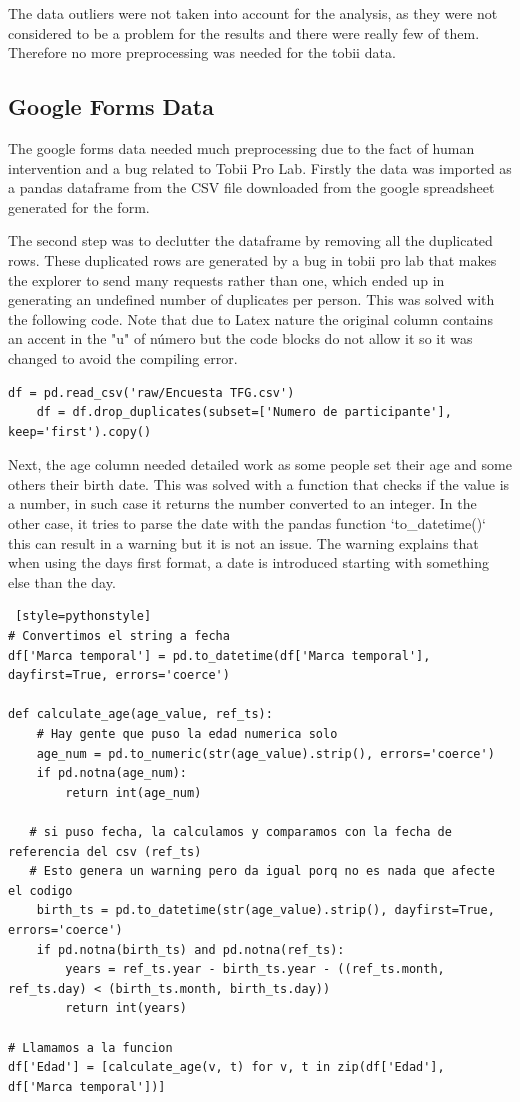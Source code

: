 The data outliers were not taken into account for the analysis, as they were not 
considered to be a problem for the results and there were really few of them. Therefore no 
more preprocessing was needed for the tobii data.
\subsection{Google Forms Data}
The google forms data needed much preprocessing due to the fact of human intervention and a bug 
related to Tobii Pro Lab. Firstly the data was imported as a pandas dataframe from the CSV file
downloaded from the google spreadsheet generated for the form. 

The second step was to declutter the dataframe by removing all the duplicated rows. These duplicated rows
are generated by a bug in tobii pro lab that makes the explorer to send many requests rather than one, which 
ended up in generating an undefined number of duplicates per person. This was solved with the following code. 
Note that due to Latex nature the original column contains an accent in the "u" of número but the code blocks
do not allow it so it was changed to avoid the compiling error.

\begin{lstlisting}[style=pythonstyle]
    df = pd.read_csv('raw/Encuesta TFG.csv')
    df = df.drop_duplicates(subset=['Numero de participante'], keep='first').copy() 
\end{lstlisting}

Next, the age column needed detailed work as some people set their age and some others their birth date. This 
was solved with a function that checks if the value is a number, in such case it returns the number converted
to an integer. In the other case, it tries to parse the date with the pandas function `to\_datetime()` this can
result in a warning but it is not an issue. The warning explains that when using the days first format, a date is 
introduced starting with something else than the day.

\begin{lstlisting} [style=pythonstyle]
# Convertimos el string a fecha
df['Marca temporal'] = pd.to_datetime(df['Marca temporal'], dayfirst=True, errors='coerce')

def calculate_age(age_value, ref_ts):
    # Hay gente que puso la edad numerica solo
    age_num = pd.to_numeric(str(age_value).strip(), errors='coerce')
    if pd.notna(age_num):
        return int(age_num)

   # si puso fecha, la calculamos y comparamos con la fecha de referencia del csv (ref_ts)
   # Esto genera un warning pero da igual porq no es nada que afecte el codigo
    birth_ts = pd.to_datetime(str(age_value).strip(), dayfirst=True, errors='coerce') 
    if pd.notna(birth_ts) and pd.notna(ref_ts):
        years = ref_ts.year - birth_ts.year - ((ref_ts.month, ref_ts.day) < (birth_ts.month, birth_ts.day))
        return int(years)

# Llamamos a la funcion
df['Edad'] = [calculate_age(v, t) for v, t in zip(df['Edad'], df['Marca temporal'])]
    
\end{lstlisting}

